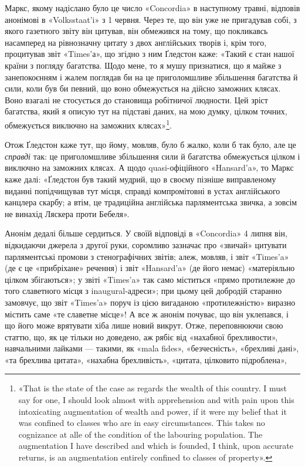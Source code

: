 Маркс, якому надіслано було це число «Concordia» в наступному
травні, відповів анонімові в «Volksstaat’i» з 1 червня. Через
те, що він уже не пригадував собі, з якого газетного звіту він цитував,
він обмежився на тому, що покликавсь насамперед на рівнозначну
цитату з двох англійських творів і, крім того, процитував
звіт «Times’а», що згідно з ним Ґледстон каже: «Такий є
стан нашої країни з погляду багатства. Щодо мене, то я мушу
признатися, що я майже з занепокоєнням і жалем поглядав би на
це приголомшливе збільшення багатства й сили, коли був би певний,
що воно обмежується на дійсно заможних клясах. Воно
взагалі не стосується до становища робітничої людности. Цей
зріст багатства, який я описую тут на підставі даних, на мою
думку, цілком точних, обмежується виключно на заможних
клясах»\footnote{«That is the state of the case as regards the wealth of this country.
I must say for one, I should look almost with apprehension and with pain
upon this intoxicating augmentation of wealth and power, if it were my
belief that it was confined to classes who are in easy circumstances. This
takes no cognizance at alle of the condition of the labouring population.
The augmentation I have described and which is founded, I think, upon
accurate returns, is an augmentation entirely confined to classes of property».}.

Отож Ґледстон каже тут, що йому, мовляв, було б жалко,
коли б так було, але це \emph{справді} так: це приголомшливе збільшення
сили й багатства обмежується цілком і виключно на заможних
клясах. А щодо quasi-офіційного «Hansard’a», то Маркс каже
далі: «Ґледстон був такий мудрий, що в своєму пізніше виправленому
виданні попідчищував тут місця, справді компромітовні
в устах англійського канцлера скарбу; а втім, це традиційна
англійська парляментська звичка, а зовсім не винахід Ляскера
проти Бебеля».

Анонім дедалі більше сердиться. У своїй відповіді в «Concordia»
4 липня він, відкидаючи джерела з другої руки, соромливо
зазначає про «звичай» цитувати парляментські промови з стенографічних
звітів; алеж, мовляв, і звіт «Times’a» (де є це «прибріхане»
речення) і звіт «Hansard’a» (де його немає) «матеріяльно
цілком збігаються»; у звіті «Times’a» так само міститься «прямо
протилежне до того славетного місця з inaugural-адреси»; при
цьому цей добродій старанно замовчує, що звіт «Times’a» поруч
із цією вигаданою «протилежністю» виразно містить саме «те
славетне місце»! А все ж анонім почуває, що він уклепався, і що
його може врятувати хіба лише новий викрут. Отже, переповнюючи
свою статтю, що, як це тільки но доведено, аж рябіє від
«нахабної брехливости», навчальними лайками — такими, як
«mala fides», «безчесність», «брехливі дані», «та брехлива цитата»,
«нахабна брехливість», «цитата, цілковито підроблена»,
\parbreak{}  %

